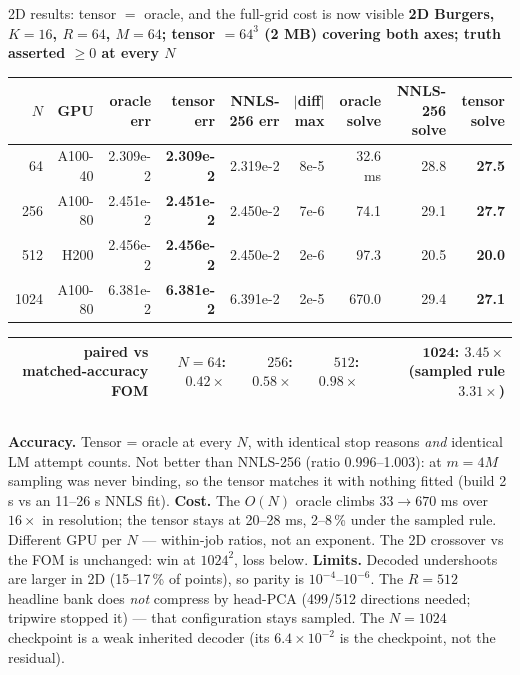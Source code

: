 \documentclass[10pt,aspectratio=169]{beamer}
\begin{document}
\begin{frame}{2D results: tensor $=$ oracle, and the full-grid cost is now visible}
  \centering\scriptsize
  \textbf{2D Burgers, $K{=}16$, $R{=}64$, $M{=}64$; tensor $= 64^3$ (2 MB) covering both axes; truth asserted $\ge 0$ at every $N$}\\[0.5mm]
  \begin{tabular}{@{}rrrrrrrrr@{}}
    \toprule
    $N$ & GPU & oracle err & \textbf{tensor err} & NNLS-256 err & $|$diff$|$ max & oracle solve & NNLS-256 solve & \textbf{tensor solve}\\
    \midrule
    64   & A100-40 & 2.309e-2 & \textbf{2.309e-2} & 2.319e-2 & 8e-5 & 32.6 ms & 28.8 & \textbf{27.5}\\
    256  & A100-80 & 2.451e-2 & \textbf{2.451e-2} & 2.450e-2 & 7e-6 & 74.1 & 29.1 & \textbf{27.7}\\
    512  & H200    & 2.456e-2 & \textbf{2.456e-2} & 2.450e-2 & 2e-6 & 97.3 & 20.5 & \textbf{20.0}\\
    1024 & A100-80 & 6.381e-2 & \textbf{6.381e-2} & 6.391e-2 & 2e-5 & 670.0 & 29.4 & \textbf{27.1}\\
    \bottomrule
  \end{tabular}
  \vspace{1mm}
  \begin{tabular}{@{}rrrrr@{}}
    \toprule
    paired vs matched-accuracy FOM & $N{=}64$: $0.42\times$ & $256$: $0.58\times$ & $512$: $0.98\times$ & $\mathbf{1024}$: $\mathbf{3.45\times}$ (sampled rule $3.31\times$)\\
    \bottomrule
  \end{tabular}

  \vspace{1mm}
  \begin{columns}[T]
    \footnotesize
    \textbf{Accuracy.} Tensor = oracle at every $N$, with identical stop reasons \emph{and} identical LM attempt counts. Not better than NNLS-256 (ratio 0.996--1.003): at $m = 4M$ sampling was never binding, so the tensor matches it with nothing fitted (build 2 s vs an 11--26 s NNLS fit).
    \footnotesize
    \textbf{Cost.} The $O(N)$ oracle climbs $33 \to 670$ ms over $16\times$ in resolution; the tensor stays at 20--28 ms, 2--8\,\% under the sampled rule. Different GPU per $N$ --- within-job ratios, not an exponent. The 2D crossover vs the FOM is unchanged: win at $1024^2$, loss below.
    \footnotesize
    \textbf{Limits.} Decoded undershoots are larger in 2D (15--17\,\% of points), so parity is $10^{-4}$--$10^{-6}$. The $R{=}512$ headline bank does \emph{not} compress by head-PCA (499/512 directions needed; tripwire stopped it) --- that configuration stays sampled. The $N{=}1024$ checkpoint is a weak inherited decoder (its $6.4\times10^{-2}$ is the checkpoint, not the residual).
  \end{columns}
\end{frame}
\end{document}

